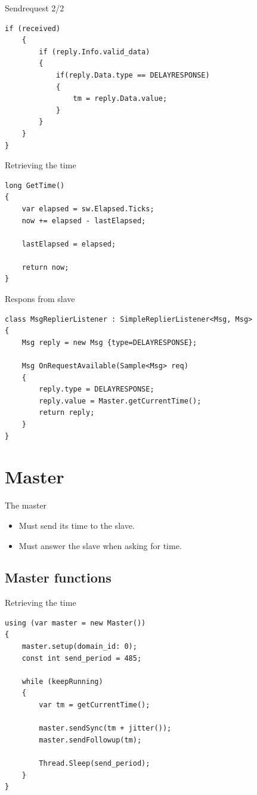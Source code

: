 \documentclass[compressed, presentation, notheorems, 12pt]{beamer}
\begin{document}
	\begin{frame}[containsverbatim]{Sendrequest 2/2}
	\begin{lstlisting}[style=Code-C++]
	if (received)
	{
		if (reply.Info.valid_data)
		{
			if(reply.Data.type == DELAYRESPONSE)
			{
				tm = reply.Data.value;
			}
		}
	}
}
	\end{lstlisting}
	\end{frame}




	\begin{frame}[containsverbatim]{Retrieving the time}
	\begin{lstlisting}[style=Code-C++]
long GetTime()
{
	var elapsed = sw.Elapsed.Ticks;
	now += elapsed - lastElapsed;

	lastElapsed = elapsed;

	return now;
}
	\end{lstlisting}
	\end{frame}



	\begin{frame}[containsverbatim]{Respons from slave}
	\begin{lstlisting}[style=Code-C++]
class MsgReplierListener : SimpleReplierListener<Msg, Msg>
{
	Msg reply = new Msg {type=DELAYRESPONSE};

	Msg OnRequestAvailable(Sample<Msg> req)
	{
		reply.type = DELAYRESPONSE;
		reply.value = Master.getCurrentTime();
		return reply;
	}
}
	\end{lstlisting}

	\end{frame}




\section{Master}

	\begin{frame}{The master}
	\begin{itemize}
		\item Must send its time to the slave.
		\item Must answer the slave when asking for time.
	\end{itemize}
	\end{frame}


\subsection{Master functions}
	\begin{frame}[containsverbatim]{Retrieving the time}
	\begin{lstlisting}[style=Code-C++]
using (var master = new Master())
{
	master.setup(domain_id: 0);
	const int send_period = 485; 

	while (keepRunning)
	{
		var tm = getCurrentTime();

		master.sendSync(tm + jitter());
		master.sendFollowup(tm);						

		Thread.Sleep(send_period);
	}
}
	\end{lstlisting}
	\end{frame}
\end{document}
